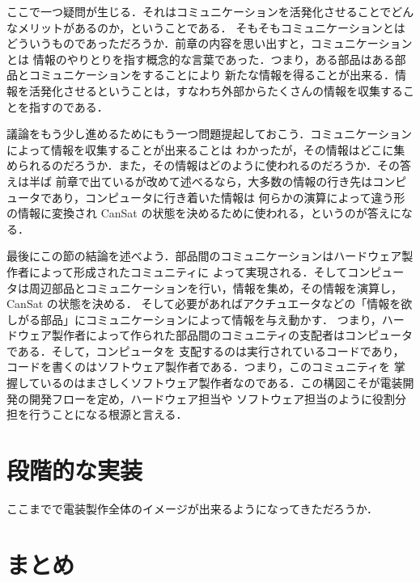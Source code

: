 \documentclass[dvipdfmx]{jsbook}
\begin{document}
  ここで一つ疑問が生じる．それはコミュニケーションを活発化させることでどんなメリットがあるのか，ということである．
  そもそもコミュニケーションとはどういうものであっただろうか．前章の内容を思い出すと，コミュニケーションとは
  情報のやりとりを指す概念的な言葉であった．つまり，ある部品はある部品とコミュニケーションをすることにより
  新たな情報を得ることが出来る．情報を活発化させるということは，すなわち外部からたくさんの情報を収集することを指すのである．

  議論をもう少し進めるためにもう一つ問題提起しておこう．コミュニケーションによって情報を収集することが出来ることは
  わかったが，その情報はどこに集められるのだろうか．また，その情報はどのように使われるのだろうか．その答えは半ば
  前章で出ているが改めて述べるなら，大多数の情報の行き先はコンピュータであり，コンピュータに行き着いた情報は
  何らかの演算によって違う形の情報に変換され CanSat の状態を決めるために使われる，というのが答えになる．


  最後にこの節の結論を述べよう．部品間のコミュニケーションはハードウェア製作者によって形成されたコミュニティに
  よって実現される．そしてコンピュータは周辺部品とコミュニケーションを行い，情報を集め，その情報を演算し，CanSat の状態を決める．
  そして必要があればアクチュエータなどの「情報を欲しがる部品」にコミュニケーションによって情報を与え動かす．
  つまり，ハードウェア製作者によって作られた部品間のコミュニティの支配者はコンピュータである．そして，コンピュータを
  支配するのは実行されているコードであり，コードを書くのはソフトウェア製作者である．つまり，このコミュニティを
  掌握しているのはまさしくソフトウェア製作者なのである．この構図こそが電装開発の開発フローを定め，ハードウェア担当や
  ソフトウェア担当のように役割分担を行うことになる根源と言える．

\section{段階的な実装}

  ここまでで電装製作全体のイメージが出来るようになってきただろうか．



\section{まとめ}
\end{document}
